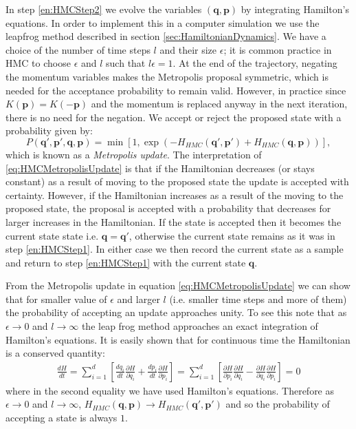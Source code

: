 \documentclass[12pt]{article}
\begin{document}
            In step \ref{en:HMCStep2} we evolve the variables $\left(\bm{q},\bm{p}\right)$ by integrating Hamilton's equations. In order to implement this in a computer simulation we use the leapfrog method described in section \ref{sec:HamiltonianDynamics}. We have a choice of the number of time steps $l$ and their size $\epsilon$; it is common practice in HMC to choose $\epsilon$ and $l$ such that $l\epsilon=1$. At the end of the trajectory, negating the momentum variables makes the Metropolis proposal symmetric, which is needed for the acceptance probability to remain valid. However, in practice since $K\left(\bm{p}\right)=K\left(-\bm{p}\right)$ and the momentum is replaced anyway in the next iteration, there is no need for the negation. We accept or reject the proposed state with a probability given by:
            \begin{equation}
                \label{eq:HMCMetropolisUpdate}
                P\left(\bm{q}',\bm{p}',\bm{q},\bm{p}\right) = \min{\left[1,\exp{\left(-H_{HMC}\left(\bm{q}',\bm{p}'\right)+ \allowbreak H_{HMC}\left(\bm{q},\bm{p}\right)\right)}\right]},
            \end{equation}
            which is known as a \textit{Metropolis update}. The interpretation of \ref{eq:HMCMetropolisUpdate} is that if the Hamiltonian decreases (or stays constant) as a result of moving to the proposed state the update is accepted with certainty. However, if the Hamiltonian increases as a result of the moving to the proposed state, the proposal is accepted with a probability that decreases for larger increases in the Hamiltonian. If the state is accepted then it becomes the current state state i.e. $\bm{q} = \bm{q}'$, otherwise the current state remains as it was in step \ref{en:HMCStep1}. In either case we then record the current state as a sample and return to step \ref{en:HMCStep1} with the current state $\bm{q}$.

            From the Metropolis update in equation \ref{eq:HMCMetropolisUpdate} we can show that for smaller value of $\epsilon$ and larger $l$ (i.e. smaller time steps and more of them) the probability of accepting an update approaches unity. To see this note that as $\epsilon \rightarrow 0$ and $l \rightarrow \infty$ the leap frog method approaches an exact integration of Hamilton's equations. It is easily shown that for continuous time the Hamiltonian is a conserved quantity:
            \begin{align}
            \frac{dH}{dt}=\sum_{i=1}^{d}\left[\frac{dq_i}{dt}\frac{\partial H}{\partial q_i}+\frac{dp_i}{dt}\frac{\partial H}{\partial p_i}\right]=\sum_{i=1}^{d}\left[\frac{\partial H}{\partial p_i}\frac{\partial H}{\partial q_i}-\frac{\partial H}{\partial q_i}\frac{\partial H}{\partial p_i}\right]=0
            \end{align}
            where in the second equality we have used Hamilton's equations. Therefore as $\epsilon \rightarrow 0$ and $l\rightarrow \infty$, $H_{HMC}\left(\bm{q},\bm{p}\right) \rightarrow H_{HMC}\left(\bm{q}',\bm{p}'\right)$ and so the probability of accepting a state is always $1$.   
\end{document}
